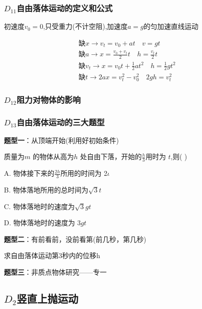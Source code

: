 \documentclass[lang=cn,10pt]{elegantbook}
\begin{document}
	\subsubsection{$D_{11}$自由落体运动的定义和公式}
	\begin{definition}
		初速度$v_0=0$,只受重力(不计空阻),加速度$a=g$的匀加速直线运动
	\end{definition}
	\begin{equation*}
		\begin{split}
			\text{缺}x\longrightarrow v_t=v_0+at\quad v=gt
			\\
			\text{缺}a\longrightarrow x=\frac{v_0+v_t}{2}t \quad h=\frac{v_t}{2}t
			\\
			\text{缺}v_t\longrightarrow x=v_0t+\frac{1}{2}at^2 \quad h=\frac{1}{2}gt^2
			\\
			\text{缺}t\longrightarrow 2ax=v_{t}^{2}-v_{0}^{2} \quad 2gh=v_{t}^{2}
		\end{split}
	\end{equation*}
	\subsubsection{$D_{12}$阻力对物体的影响}
	\subsubsection{$D_{13}$自由落体运动的三大题型}
	\textbf{题型一}：从顶端开始(利用好初始条件)
	\vspace{1.5cm}
	\begin{example}
		质量为$m$ 的物体从高为$h$ 处自由下落，开始的$\frac h3$用时为
		$t$,则( )
		
		 A. 物体接下来的$\frac{2h}{3}$所用的时间为 2$\iota$ 
		
		B. 物体落地所用的总时间为$\sqrt{3}t$
		
		C. 物体落地时的速度为$\sqrt{3}gt$
		
		D. 物体落地时的速度为 $3gt$
	\end{example}
	\vspace{1.8cm}
	\textbf{题型二}：有前看前，没前看第(前几秒，第几秒)
	\vspace{1.5cm}
	\begin{example}
		求自由落体运动第3秒内的位移h
	\end{example}
	
	\textbf{题型三}：非质点物体研究——专一
	\vspace{1.8cm}
	\subsection{$D_2$竖直上抛运动}
\end{document}
